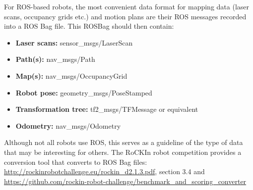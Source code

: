     For ROS-based robots, the most convenient data format for mapping data (laser scans, occupancy grids etc.) and motion plans are their ROS messages recorded into a ROS Bag file.
    This ROSBag should then contain:
     \begin{itemize}
       \item \textbf{Laser scans: } sensor\_msgs/LaserScan
       \item \textbf{Path(s): } nav\_msgs/Path
       \item \textbf{Map(s): } nav\_msgs/OccupancyGrid
       \item \textbf{Robot pose: } geometry\_msgs/PoseStamped
       \item \textbf{Transformation tree: } tf2\_msgs/TFMessage or equivalent
       \item \textbf{Odometry: } nav\_msgs/Odometry
      \end{itemize}
    Although not all robots use ROS, this serves as a guideline of the type of data that may be interesting for others.
    The RoCKIn robot competition provides a conversion tool that converts to ROS Bag files:
    \url{http://rockinrobotchallenge.eu/rockin_d2.1.3.pdf}, section 3.4 and
    \url{https://github.com/rockin-robot-challenge/benchmark_and_scoring_converter}

